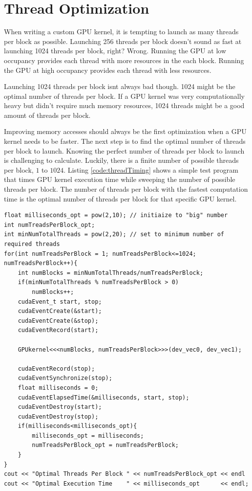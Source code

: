 \section{Thread Optimization}
When writing a custom GPU kernel, it is tempting to launch as many threads per block as possible.
Launching 256 threads per block doesn't sound as fast at launching 1024 threads per block, right?
Wrong. Running the GPU at low occupancy provides each thread with more resources in the each block.
Running the GPU at high occupancy provides each thread with less resources.

Launching 1024 threads per block isnt always bad though.
1024 might be the optimal number of threads per block.
If a GPU kernel was very computationally heavy but didn't require much memory resources, 1024 threads might be a good amount of threads per block.

Improving memory accesses should always be the first optimization when a GPU kernel needs to be faster.
The next step is to find the optimal number of threads per block to launch.
Knowing the perfect number of threads per block to launch is challenging to calculate.
Luckily, there is a finite number of possible threads per block, $1$ to $1024$.
Listing \ref{code:threadTiming} shows a simple test program that times GPU kernel execution time while sweeping the number of possible threads per block.
The number of threads per block with the fastest computation time is the optimal number of threads per block for that specific GPU kernel.

\singlespacing
\clearpage
\begin{lstlisting}[style=myCUDAstyle,caption={Code snippet for thread optimization.},label={code:threadTiming}]
float milliseconds_opt = pow(2,10); // initiaize to "big" number
int numTreadsPerBlock_opt;
int minNumTotalThreads = pow(2,20); // set to minimum number of required threads
for(int numTreadsPerBlock = 1; numTreadsPerBlock<=1024; numTreadsPerBlock++){
	int numBlocks = minNumTotalThreads/numTreadsPerBlock;
	if(minNumTotalThreads % numTreadsPerBlock > 0)
		numBlocks++;
	cudaEvent_t start, stop;
	cudaEventCreate(&start);
	cudaEventCreate(&stop);
	cudaEventRecord(start);
	
	GPUkernel<<<numBlocks, numTreadsPerBlock>>>(dev_vec0, dev_vec1);
	
	cudaEventRecord(stop);
	cudaEventSynchronize(stop);
	float milliseconds = 0;
	cudaEventElapsedTime(&milliseconds, start, stop);
	cudaEventDestroy(start);
	cudaEventDestroy(stop);
	if(milliseconds<milliseconds_opt){
		milliseconds_opt = milliseconds;
		numTreadsPerBlock_opt = numTreadsPerBlock;
	}
}
cout << "Optimal Threads Per Block " << numTreadsPerBlock_opt << endl
cout << "Optimal Execution Time    " << milliseconds_opt      << endl;
\end{lstlisting}
\doublespacing

